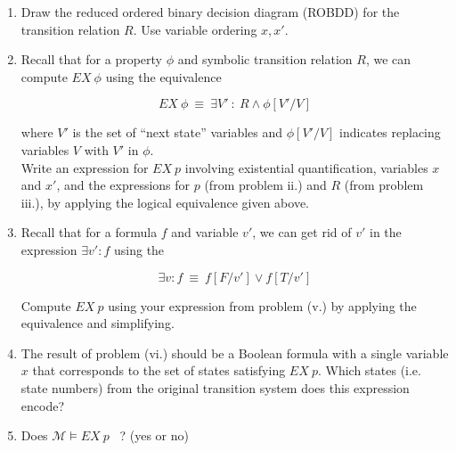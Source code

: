 \documentclass[12pt]{article}
\newenvironment{problem}[2][Problem]{\begin{trivlist}
\item[\hskip \labelsep {\bfseries #1}\hskip \labelsep {\bfseries #2.}]}{\end{trivlist}}
\begin{document}
\begin{problem}{Symbolic Model Checking}
\begin{enumerate}[label=\roman*.]
\vspace{1.5cm}


\item Draw the reduced ordered binary decision diagram (ROBDD) for the transition relation $R$. Use variable ordering $x, x'$.

\newpage

\item Recall that for a property $\phi$ and symbolic transition relation $R$, we can compute $EX \ \phi$ using the equivalence

$$EX \ \phi \ \equiv \ \exists V' \ : \ R \land \phi[V' / V]$$

where $V'$ is the set of ``next state'' variables and $\phi[V' / V]$ indicates replacing variables $V$ with $V'$ in $\phi$. \\

Write an expression for $EX \ p$ involving existential quantification, variables $x$ and $x'$, and the expressions for $p$ (from problem ii.) and $R$ (from problem iii.), by applying the logical equivalence given above.


\vspace{3cm}


\item Recall that for a formula $f$ and variable $v'$, we can get rid of $v'$ in the expression $\exists v' : f$ using the 

$$\exists v : f \ \equiv \ f[F / v'] \lor f[T / v']$$

Compute $EX \ p$ using your expression from problem (v.) by applying the equivalence and simplifying.

\vspace{6cm}



\item The result of problem (vi.) should be a Boolean formula with a single variable $x$ that corresponds to the set of states satisfying $EX \ p$. Which states (i.e. state numbers) from the original transition system does this expression encode? 


\vspace{1.5cm}

\item Does $\mathcal{M} \models EX \ p $ \ ? (yes or no)


\end{enumerate}

\end{problem}


\newpage
\end{document}
